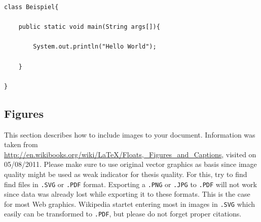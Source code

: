 \begin{lstlisting}[float=h, caption=Example code is presented here, label=list:code, frame=single]
class Beispiel{

	public static void main(String args[]){
	
		System.out.println("Hello World");
		
	}
	
}
\end{lstlisting}

\newpage
\subsection*{Figures}
This section describes how to include images to your document. Information was taken from \url{http://en.wikibooks.org/wiki/LaTeX/Floats,_Figures_and_Captions}, visited on 05/08/2011. Please make sure to use original vector graphics as basis since image quality might be used as weak indicator for thesis quality. For this, try to find find files in \texttt{.SVG} or \texttt{.PDF} format. Exporting a \texttt{.PNG} or \texttt{.JPG} to \texttt{.PDF} will not work since data was already lost while exporting it to these formats. This is the case for most Web graphics. Wikipedia startet entering most in images in \texttt{.SVG} which easily can be transformed to \texttt{.PDF}, but please do not forget proper citations.

